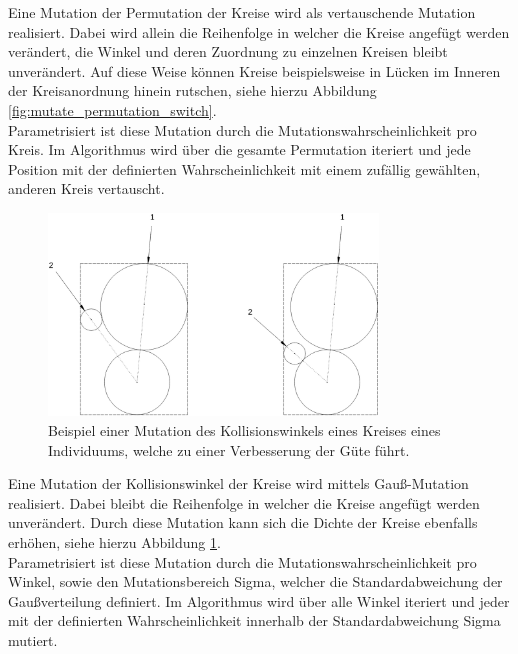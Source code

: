 \documentclass[twoside,bibtotoc]{report}
\begin{document}
Eine Mutation der Permutation der Kreise wird als vertauschende Mutation realisiert.
Dabei wird allein die Reihenfolge in welcher die Kreise angefügt werden verändert, die Winkel und deren Zuordnung zu einzelnen Kreisen bleibt unverändert.
Auf diese Weise können Kreise beispielsweise in Lücken im Inneren der Kreisanordnung hinein rutschen, siehe hierzu Abbildung \ref{fig:mutate_permutation_switch}.\\

Parametrisiert ist diese Mutation durch die Mutationswahrscheinlichkeit pro Kreis.
Im Algorithmus wird über die gesamte Permutation iteriert und jede Position mit der definierten Wahrscheinlichkeit mit einem zufällig gewählten, anderen Kreis vertauscht.

\nsecend %



\begin{figure}[H]
 \centering
 \includegraphics [width=0.78\textwidth]{Bilder/5.png}
 \caption{
 	Beispiel einer Mutation des Kollisionswinkels eines Kreises eines Individuums,
 	welche zu einer Verbesserung der Güte führt.
 	}
 \label{fig:mutate_angle}
\end{figure}

Eine Mutation der Kollisionswinkel der Kreise wird mittels Gauß-Mutation realisiert.
Dabei bleibt die Reihenfolge in welcher die Kreise angefügt werden unverändert.
Durch diese Mutation kann sich die Dichte der Kreise ebenfalls erhöhen, siehe hierzu Abbildung \ref{fig:mutate_angle}.\\

Parametrisiert ist diese Mutation durch die Mutationswahrscheinlichkeit pro Winkel, sowie den Mutationsbereich Sigma, welcher die Standardabweichung der Gaußverteilung definiert.
Im Algorithmus wird über alle Winkel iteriert und jeder mit der definierten Wahrscheinlichkeit innerhalb der Standardabweichung Sigma mutiert.
\end{document}
